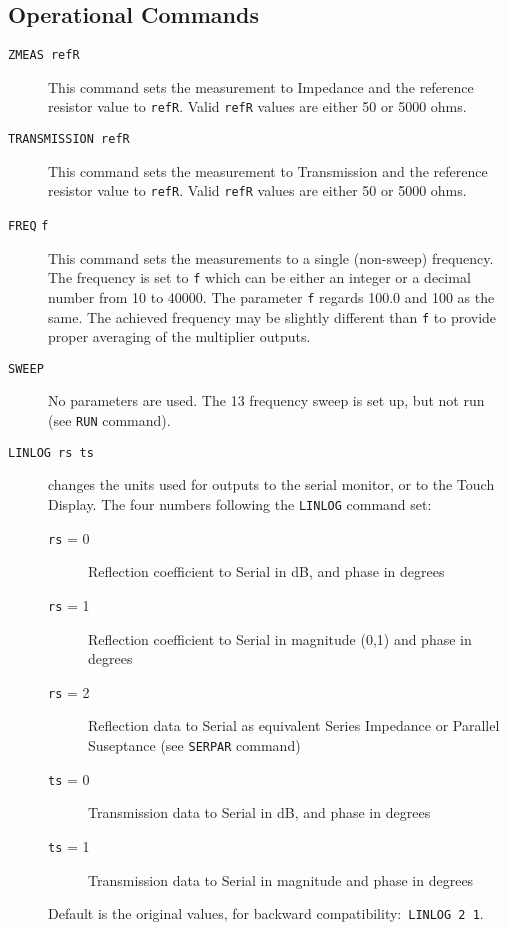 \subsection{Operational Commands}
\label{subsect:SerCmd}
\begin{description}

\item[\texttt{ZMEAS refR}]
This command sets the measurement to Impedance and the reference resistor value to \texttt{refR}.  Valid \texttt{refR} values are either 50 or 5000 ohms.

\item[\texttt{TRANSMISSION refR}]
This command sets the measurement to Transmission and the reference resistor value to \texttt{refR}.  Valid \texttt{refR} values are either 50 or 5000 ohms.

\item[\texttt{FREQ} \texttt{f}]
This command sets the measurements to a single (non-sweep) frequency. The frequency is set to \texttt{f} which can be either an integer or a decimal number from 10 to 40000.   The parameter \texttt{f} regards 100.0 and 100 as the same.  The achieved frequency may be slightly different than \texttt{f} to provide proper averaging of the multiplier outputs.

\item[\texttt{SWEEP}]   No parameters are used.  The 13 frequency sweep is set up, but not run (see \texttt{RUN} command).

\item[\texttt{LINLOG rs ts}]  changes the units used for outputs to the serial monitor,
  or to the Touch Display.  The four numbers following the \texttt{LINLOG} command set:
\begin{description}
\item[\texttt{rs} = 0]  Reflection coefficient to Serial in dB, and phase in degrees
\item[\texttt{rs} = 1]  Reflection coefficient to Serial in magnitude (0,1) and phase in degrees
\item[\texttt{rs} = 2]  Reflection data to Serial as equivalent Series Impedance or Parallel Suseptance (see \texttt{SERPAR} command)
\item[\texttt{ts} = 0]  Transmission data to Serial in dB, and phase in degrees
\item[\texttt{ts} = 1]  Transmission data to Serial in magnitude and phase in degrees
\end{description}
   Default is the original values, for backward compatibility:\mbox{ \texttt{LINLOG 2 1}.}


\end{description}
